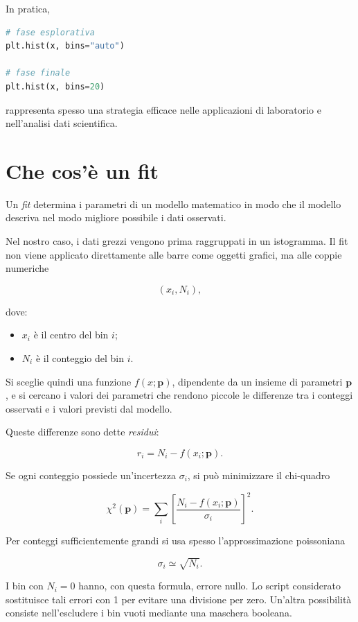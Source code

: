 \documentclass[11pt,a4paper]{book}
\begin{document}
In pratica,

\begin{lstlisting}[language=Python]
# fase esplorativa
plt.hist(x, bins="auto")

# fase finale
plt.hist(x, bins=20)
\end{lstlisting}

rappresenta spesso una strategia efficace nelle applicazioni di
laboratorio e nell'analisi dati scientifica.






\section{Che cos'è un fit}

Un \emph{fit} determina i parametri di un modello matematico in modo che
il modello descriva nel modo migliore possibile i dati osservati.

Nel nostro caso, i dati grezzi vengono prima raggruppati in un
istogramma. Il fit non viene applicato direttamente alle barre come
oggetti grafici, ma alle coppie numeriche

\[
(x_i,N_i),
\]

dove:

\begin{itemize}
    \item $x_i$ è il centro del bin $i$;
    \item $N_i$ è il conteggio del bin $i$.
\end{itemize}

Si sceglie quindi una funzione $f(x;\boldsymbol{p})$, dipendente da un
insieme di parametri $\boldsymbol{p}$, e si cercano i valori dei
parametri che rendono piccole le differenze tra i conteggi osservati e i
valori previsti dal modello.

Queste differenze sono dette \emph{residui}:

\[
r_i=N_i-f(x_i;\boldsymbol{p}).
\]

Se ogni conteggio possiede un'incertezza $\sigma_i$, si può minimizzare
il chi-quadro

\[
\chi^2(\boldsymbol{p})=
\sum_i
\left[
\frac{N_i-f(x_i;\boldsymbol{p})}{\sigma_i}
\right]^2.
\]

Per conteggi sufficientemente grandi si usa spesso l'approssimazione
poissoniana

\[
\sigma_i\simeq\sqrt{N_i}.
\]

I bin con $N_i=0$ hanno, con questa formula, errore nullo. Lo script
considerato sostituisce tali errori con 1 per evitare una divisione per
zero. Un'altra possibilità consiste nell'escludere i bin vuoti mediante
una maschera booleana.
\end{document}
